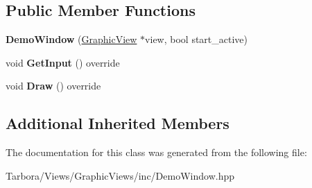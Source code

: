 \subsection*{Public Member Functions}
\begin{DoxyCompactItemize}
\item 
\mbox{\label{classTarbora_1_1DemoWindow_a20c62ad3f1602152c50efcb1e2c3b16d}} 
{\bfseries Demo\+Window} (\hyperlink{classTarbora_1_1GraphicView}{Graphic\+View} $\ast$view, bool start\+\_\+active)
\item 
\mbox{\label{classTarbora_1_1DemoWindow_a36b177bfce91167494db75fe15695a9f}} 
void {\bfseries Get\+Input} () override
\item 
\mbox{\label{classTarbora_1_1DemoWindow_a1a9b60c08f450723c3eec3819ecccce8}} 
void {\bfseries Draw} () override
\end{DoxyCompactItemize}
\subsection*{Additional Inherited Members}


The documentation for this class was generated from the following file\+:\begin{DoxyCompactItemize}
\item 
Tarbora/\+Views/\+Graphic\+Views/inc/Demo\+Window.\+hpp\end{DoxyCompactItemize}
